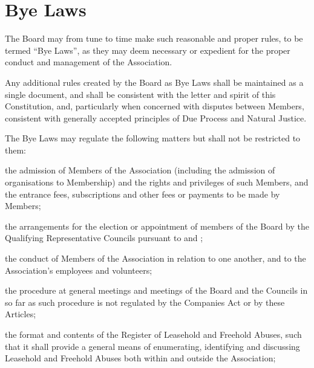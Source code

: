 \documentclass[10pt]{mk-articles-of-association}
\newcommand{\EC}[0]{Board}
\newcommand{\Exec}[0]{\EC{} }
\newcommand{\LAFA}[0]{Leasehold and Freehold Abuses}
\begin{document}


\section{Bye Laws}

\begin{constenum}

\item The \Exec may from tune to time make such reasonable and proper
  rules, to be termed ``Bye Laws'', as they may deem necessary or
  expedient for the proper conduct and management of the Association.

\item Any additional rules created by the \Exec as Bye Laws
  shall be maintained as a single document, and shall be
  consistent with the letter and spirit of this Constitution, and,
  particularly when concerned with disputes between Members,
  consistent with generally accepted principles of Due Process and
  Natural Justice.

\item The Bye Laws may regulate the following matters but shall not be
  restricted to them:

\begin{constenum}

\item the admission of Members of the Association (including the admission
  of organisations to Membership) and the rights and privileges of
  such Members, and the entrance fees, subscriptions and other fees or
  payments to be made by Members;

\item the arrangements for the election or appointment of members of
  the \Exec by the Qualifying Representative Councils pursuant to
   and ;

\item the conduct of Members of the Association in relation to one
  another, and to the Association's employees and volunteers;

\item the procedure at general meetings and meetings of the \Exec and
  the Councils in so far as such procedure is not regulated by the
  Companies Act or by these Articles;

\item the format and contents of the Register of \LAFA, such that
  it shall provide a general means of enumerating, identifying and
  discussing \LAFA{} both within and outside the Association; \ITand


\end{constenum}
\end{constenum}
\end{document}
